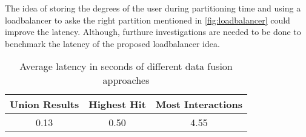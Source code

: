 The idea of storing the degrees of the user during partitioning time and using a loadbalancer to aske the right partition mentioned in \ref{fig:loadbalancer} could improve the latency. Although, furthure investigations are needed to be done to benchmark the latency of the proposed loadbalancer idea.


\begin{table}[!ht]
    \centering
    \caption{Average latency in seconds of different data fusion approaches}
    \label{tab:data-fusion-latency}
    \begin{tabular}{|c|c|c|}
        \hline
        \textbf{Union Results} & \textbf{Highest Hit} & \textbf{Most Interactions} \\
        \hline
        0.13 & 0.50 & 4.55 \\
        \hline
    \end{tabular}
\end{table}

